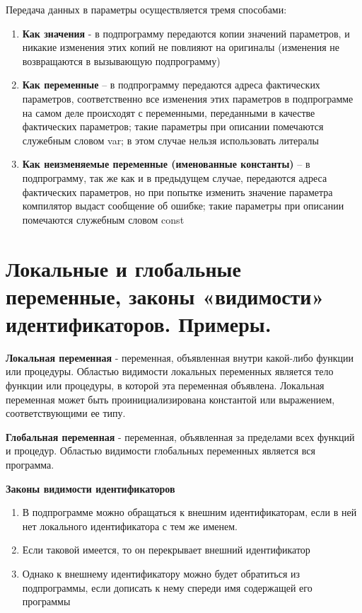 Передача данных в параметры осуществляется тремя способами:
\begin{enumerate}
    \item	{\bf Как значения} -  в подпрограмму передаются копии значений параметров, и никакие изменения этих копий не повлияют на оригиналы (изменения не возвращаются в вызывающую подпрограмму)
    \item	{\bf Как переменные} – в подпрограмму передаются адреса фактических параметров, соответственно все изменения этих параметров в подпрограмме на самом деле происходят с переменными, переданными в качестве фактических параметров; такие параметры при описании помечаются служебным словом var; в этом случае нельзя использовать литералы
    \item	{\bf Как неизменяемые переменные (именованные константы)} – в подпрограмму, так же как и в предыдущем случае, передаются адреса фактических параметров, но при попытке изменить значение параметра компилятор выдаст сообщение об ошибке; такие параметры при описании помечаются служебным словом const
\end{enumerate}




\newpage\section{Локальные и глобальные переменные, законы «видимости» идентификаторов. Примеры. }

\begin{myquote}
\end{myquote}

{\bf{Локальная переменная}} - переменная, объявленная внутри какой-либо функции или процедуры. Областью видимости локальных переменных является тело функции или процедуры, в которой эта переменная объявлена. Локальная переменная может быть проинициализирована константой или выражением, соответствующими ее типу.

{\bf{Глобальная переменная}} - переменная, объявленная за пределами всех функций и процедур. Областью видимости глобальных переменных является вся программа.



{\bf{Законы видимости идентификаторов}}

\begin{enumerate}
    
\item В подпрограмме можно обращаться к внешним идентификаторам, если в ней нет локального идентификатора с тем же именем.
\item Если таковой имеется, то он перекрывает внешний идентификатор
\item Однако к внешнему идентификатору можно будет обратиться из подпрограммы, если дописать к нему спереди имя содержащей его программы

\end{enumerate}

